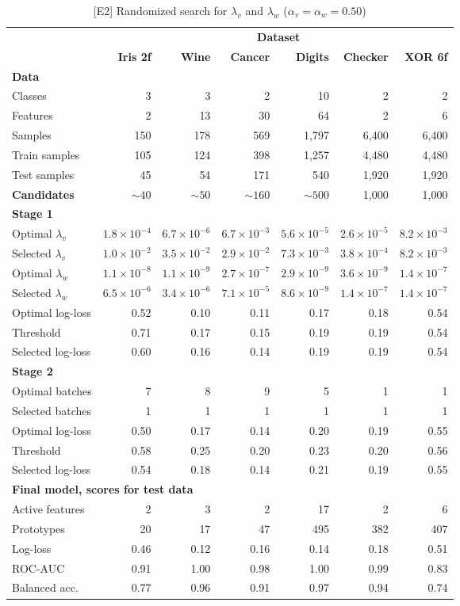%
\begin{table}
\caption{[E2] Randomized search for $\lambda_v$ and $\lambda_w$ ($\alpha_v=\alpha_w=0.50$)}
\label{tab_e2}
%
\begin{center}
\small
\begin{tabular}{|lrrrrrr|}
\hline
&\multicolumn{6}{c|}{\textbf{\hrulefill\ Dataset \hrulefill}}\\
&\textbf{Iris 2f}&\textbf{Wine}&\textbf{Cancer}&\textbf{Digits}&\textbf{Checker}&\textbf{XOR 6f}\\
\multicolumn{7}{|l|}{\textbf{Data}}\\
Classes&3&3&2&10&2&2\\
Features&2&13&30&64&2&6\\
Samples&150&178&569&1,797&6,400&6,400\\
Train samples&105&124&398&1,257&4,480&4,480\\
Test samples&45&54&171&540&1,920&1,920\\
\textbf{Candidates}&$\sim40$&$\sim50$&$\sim160$&$\sim500$&1,000&1,000\\
\multicolumn{7}{|l|}{\textbf{Stage 1}}\\
Optimal $\lambda_v$&$1.8\times10^{-4}$&$6.7\times10^{-6}$&$6.7\times10^{-3}$&$5.6\times10^{-5}$&$2.6\times10^{-5}$&$8.2\times10^{-3}$\\
Selected $\lambda_v$&$1.0\times10^{-2}$&$3.5\times10^{-2}$&$2.9\times10^{-2}$&$7.3\times10^{-3}$&$3.8\times10^{-4}$&$8.2\times10^{-3}$\\
Optimal $\lambda_w$&$1.1\times10^{-8}$&$1.1\times10^{-9}$&$2.7\times10^{-7}$&$2.9\times10^{-9}$&$3.6\times10^{-9}$&$1.4\times10^{-7}$\\
Selected $\lambda_w$&$6.5\times10^{-6}$&$3.4\times10^{-6}$&$7.1\times10^{-5}$&$8.6\times10^{-9}$&$1.4\times10^{-7}$&$1.4\times10^{-7}$\\
Optimal log-loss&0.52&0.10&0.11&0.17&0.18&0.54\\
Threshold&0.71&0.17&0.15&0.19&0.19&0.54\\
Selected log-loss&0.60&0.16&0.14&0.19&0.19&0.54\\
\multicolumn{7}{|l|}{\textbf{Stage 2}}\\
Optimal batches&7&8&9&5&1&1\\
Selected batches&1&1&1&1&1&1\\
Optimal log-loss&0.50&0.17&0.14&0.20&0.19&0.55\\
Threshold&0.58&0.25&0.20&0.23&0.20&0.56\\
Selected log-loss&0.54&0.18&0.14&0.21&0.19&0.55\\
\multicolumn{7}{|l|}{\textbf{Final model, scores for test data}}\\
Active features&2&3&2&17&2&6\\
Prototypes&20&17&47&495&382&407\\
Log-loss&0.46&0.12&0.16&0.14&0.18&0.51\\
ROC-AUC&0.91&1.00&0.98&1.00&0.99&0.83\\
Balanced acc.&0.77&0.96&0.91&0.97&0.94&0.74\\
\hline
\end{tabular}
\end{center}
\end{table}

